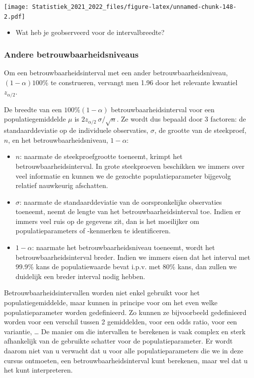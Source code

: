 \documentclass[
  12pt,dutch,coursenotes]{book}
\providecommand{\tightlist}{%
  \setlength{\itemsep}{0pt}\setlength{\parskip}{0pt}}
\theoremstyle{definition}
\theoremstyle{definition}
\theoremstyle{definition}
\theoremstyle{definition}
\theoremstyle{remark}
\begin{document}
\texttt{[image: Statistiek\_2021\_2022\_files/figure-latex/unnamed-chunk-148-2.pdf]}

\begin{itemize}
\tightlist
\item
  Wat heb je geobserveerd voor de intervalbreedte?
\end{itemize}

\hypertarget{andere-betrouwbaarheidsniveaus}{%
\subsubsection{Andere betrouwbaarheidsniveaus}\label{andere-betrouwbaarheidsniveaus}}

Om een betrouwbaarheidsinterval met een ander betrouwbaarheidsniveau, \((1- \alpha)100\%\) te construeren, vervangt men 1.96 door het relevante kwantiel \(z_{\alpha/2}.\)

De breedte van een \(100\%(1-\alpha)\) betrouwbaarheidsinterval voor een
populatiegemiddelde \(\mu\) is \(2 z_{\alpha/2} \ \sigma/\sqrt{n}\). Ze wordt
dus bepaald door 3 factoren: de standaarddeviatie op de individuele
observaties, \(\sigma\), de grootte van de steekproef, \(n\), en het
betrouwbaarheidsniveau, \(1-\alpha\):

\begin{itemize}
\item
  \(n\): naarmate de steekproefgrootte toeneemt, krimpt het
  betrouwbaarheidsinterval. In grote steekproeven beschikken we immers over veel informatie en kunnen we de gezochte populatieparameter bijgevolg relatief nauwkeurig afschatten.
\item
  \(\sigma\): naarmate de standaarddeviatie van de oorspronkelijke
  observaties toeneemt, neemt de lengte van het betrouwbaarheidsinterval toe. Indien er immers veel ruis op de gegevens zit, dan is het moeilijker om populatieparameters of -kenmerken te identificeren.
\item
  \(1-\alpha\): naarmate het betrouwbaarheidsniveau toeneemt, wordt het
  betrouwbaarheidsinterval breder. Indien we immers eisen dat het interval met 99.9\% kans de populatiewaarde bevat i.p.v. met 80\% kans, dan zullen we duidelijk een breder interval nodig hebben.
\end{itemize}

Betrouwbaarheidsintervallen worden niet enkel gebruikt voor het
populatiegemiddelde, maar kunnen in principe voor om het even welke
populatieparameter worden gedefinieerd. Zo kunnen ze bijvoorbeeld
gedefinieerd worden voor een verschil tussen 2 gemiddelden, voor een odds ratio, voor een variantie, \ldots{} De manier om die
intervallen te berekenen is vaak complex en sterk afhankelijk van de
gebruikte schatter voor de populatieparameter. Er wordt daarom niet van u
verwacht dat u voor alle populatieparameters die we in deze cursus
ontmoeten, een betrouwbaarheidsinterval kunt berekenen, maar wel dat u het
kunt interpreteren.
\end{document}
